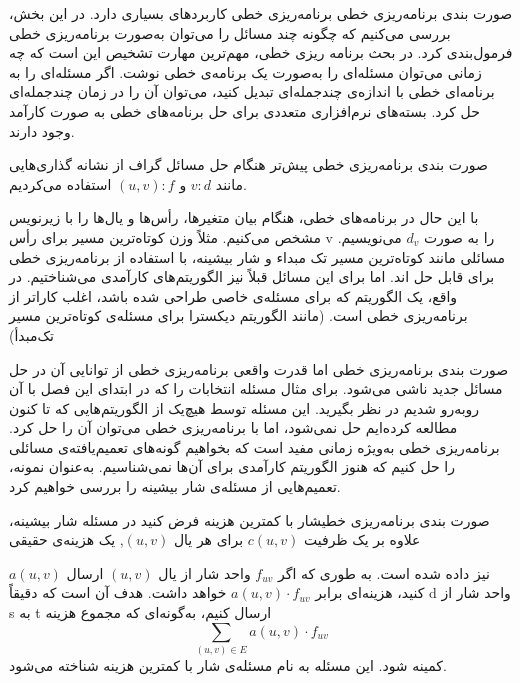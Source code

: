 \begin{itemframe}{صورت بندی برنامه‌ریزی خطی}
\itm
برنامه‌ریزی خطی کاربردهای بسیاری دارد. در این بخش، بررسی می‌کنیم که چگونه چند مسائل را می‌توان به‌صورت برنامه‌ریزی خطی فرمول‌بندی کرد.
\itm
در بحث برنامه ریزی خطی، مهم‌ترین مهارت تشخیص این است که چه زمانی می‌توان مسئله‌ای را به‌صورت یک برنامه‌ی خطی نوشت.
اگر مسئله‌ای را به برنامه‌ای خطی با اندازه‌ی چندجمله‌ای تبدیل کنید، می‌توان آن را در زمان چندجمله‌ای حل کرد.
بسته‌های نرم‌افزاری متعددی برای حل برنامه‌های خطی به صورت کارآمد وجود دارند.
\end{itemframe}


\begin{itemframe}{صورت بندی برنامه‌ریزی خطی}
\itm
پیش‌تر هنگام حل مسائل گراف از نشانه گذاری‌هایی مانند
$v:d$
و
$(u,v):f$
استفاده می‌کردیم.

با این حال در برنامه‌های خطی، هنگام بیان متغیرها، رأس‌ها و یال‌ها را با زیرنویس مشخص می‌کنیم.
مثلاً وزن کوتاه‌ترین مسیر برای رأس v را به صورت
$d_v$
می‌نویسیم.
\itm
مسائلی مانند کوتاه‌ترین مسیر تک مبداء و شار بیشینه، با استفاده از برنامه‌ریزی خطی برای قابل حل اند. اما برای این مسائل قبلاً نیز الگوریتم‌های کارآمدی می‌شناختیم.
\itm
در واقع، یک الگوریتم که برای مسئله‌ی خاصی طراحی شده باشد، اغلب کاراتر از برنامه‌ریزی خطی است. (مانند الگوریتم دیکسترا برای مسئله‌ی کوتاه‌ترین مسیر تک‌مبدأ)

\end{itemframe}


\begin{itemframe}{صورت بندی برنامه‌ریزی خطی}
\itm
اما قدرت واقعی برنامه‌ریزی خطی از توانایی آن در حل مسائل جدید ناشی می‌شود.
\itm
برای مثال مسئله انتخابات را که در ابتدای این فصل با آن روبه‌رو شدیم در نظر بگیرید. این مسئله توسط هیچ‌یک از الگوریتم‌هایی که تا کنون مطالعه کرده‌ایم حل نمی‌شود، اما با برنامه‌ریزی خطی می‌توان آن را حل کرد.
\itm
برنامه‌ریزی خطی به‌ویژه زمانی مفید است که بخواهیم گونه‌های تعمیم‌یافته‌ی مسائلی را حل کنیم که هنوز الگوریتم کارآمدی برای آن‌ها نمی‌شناسیم. به‌عنوان نمونه، تعمیم‌هایی از مسئله‌ی شار بیشینه را بررسی خواهیم کرد.
\end{itemframe}


\begin{itemframe-s}{صورت بندی برنامه‌ریزی خطی}{شار با کمترین هزینه}
\itm
فرض کنید در مسئله شار بیشینه، علاوه بر یک ظرفیت
$c(u,v)$
برای هر یال
$(u,v)$,
یک هزینه‌ی حقیقی

$a(u,v)$
نیز داده شده است.
\itm
به طوری که اگر
$f_{uv}$
واحد شار از یال
$(u,v)$
ارسال کنید، هزینه‌ای برابر
$a(u,v) \cdot f_{uv}$
خواهد داشت.
\itm
هدف آن است که دقیقاً d واحد شار از s به t ارسال کنیم، به‌گونه‌ای که مجموع هزینه
$$
\sum_{(u,v) \in E} a(u,v) \cdot f_{uv}
$$
کمینه شود. این مسئله به نام مسئله‌ی شار با کمترین هزینه
 شناخته می‌شود.
\end{itemframe-s}


